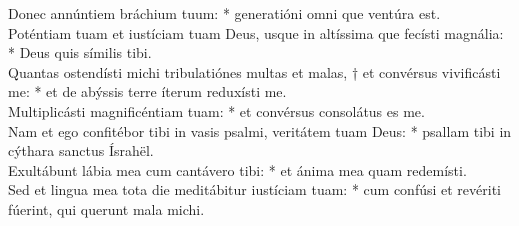 {	Donec annúntiem bráchium tuum: * generatióni omni que ventúra est. \\
	Poténtiam tuam et iustíciam tuam Deus, usque in altíssima que fecísti magnália: * Deus quis símilis tibi. \\
	Quantas ostendísti michi tribulatiónes multas et malas, † et convérsus vivificásti me: * et de abýssis terre íterum reduxísti me. \\
	Multiplicásti magnificéntiam tuam: * et convérsus consolátus es me. \\
	Nam et ego confitébor tibi in vasis psalmi, veritátem tuam Deus: * psallam tibi in cýthara sanctus Ísrahël. \\
	Exultábunt lábia mea cum cantávero tibi: * et ánima mea quam redemísti. \\
	Sed et lingua mea tota die meditábitur iustíciam tuam: * cum confúsi et revériti fúerint, qui querunt mala michi.
}

